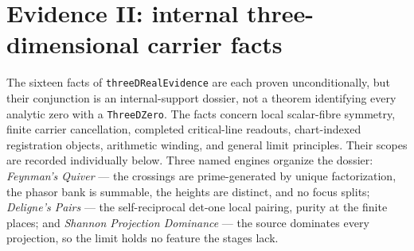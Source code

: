 \section{Evidence II: internal three-dimensional carrier facts}
\label{sec:grh-E2}

The sixteen facts of \texttt{threeDRealEvidence} are each proven
unconditionally, but their conjunction is an internal-support dossier, not a
theorem identifying every analytic zero with a \texttt{ThreeDZero}.  The
facts concern local scalar-fibre symmetry, finite carrier cancellation,
completed critical-line readouts, chart-indexed registration objects,
arithmetic winding, and general limit principles.  Their scopes are recorded
individually below.  Three named engines organize the dossier:
\emph{Feynman's Quiver} --- the crossings are prime-generated by unique factorization, the
phasor bank is summable, the heights are distinct, and no focus splits; \emph{Deligne's
Pairs} --- the self-reciprocal det-one local pairing, purity at the finite places; and
\emph{Shannon Projection Dominance} --- the source dominates every projection, so the limit
holds no feature the stages lack.

